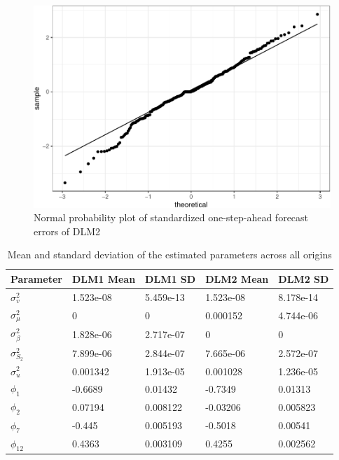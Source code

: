 \documentclass[12pt, a4paper]{article}
\begin{document}
\begin{figure}[H]
  \caption{\label{fig:qqnorm}Normal probability plot of standardized
one-step-ahead forecast errors of DLM2}
\centering
\includegraphics[scale = 0.8]{../figs/freq--qqnorm-1.pdf}
\end{figure}

\begin{table}[H]

\caption{\label{tab:par-comparison}Mean and standard deviation of the estimated parameters across all origins}
\centering
\begin{tabular}{lllll}
\toprule
Parameter & DLM1 Mean & DLM1 SD & DLM2 Mean & DLM2 SD\\
\midrule
$\sigma_{v}^{2}$ & 1.523e-08 & 5.459e-13 & 1.523e-08 & 8.178e-14\\
$\sigma_{\mu}^{2}$ & 0 & 0 & 0.000152 & 4.744e-06\\
$\sigma_{\beta}^{2}$ & 1.828e-06 & 2.717e-07 & 0 & 0\\
$\sigma_{S_{2}}^{2}$ & 7.899e-06 & 2.844e-07 & 7.665e-06 & 2.572e-07\\
$\sigma^{2}_{u}$ & 0.001342 & 1.913e-05 & 0.001028 & 1.236e-05\\
\addlinespace
$\phi_{1}$ & -0.6689 & 0.01432 & -0.7349 & 0.01313\\
$\phi_{2}$ & 0.07194 & 0.008122 & -0.03206 & 0.005823\\
$\phi_{7}$ & -0.445 & 0.005193 & -0.5018 & 0.00541\\
$\phi_{12}$ & 0.4363 & 0.003109 & 0.4255 & 0.002562\\
\bottomrule
\end{tabular}
\end{table}
\end{document}
